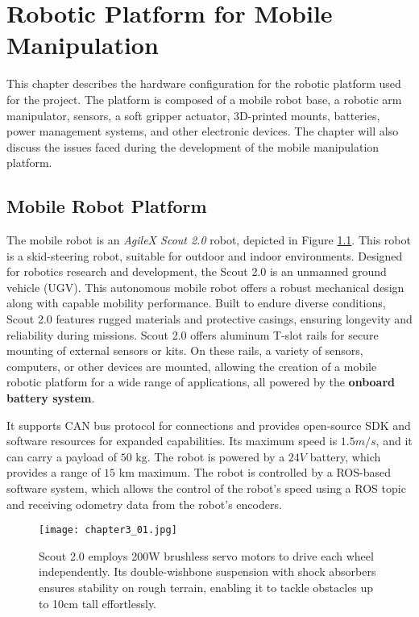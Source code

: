 
\chapter{Robotic Platform for Mobile Manipulation}

This chapter describes the hardware configuration for the robotic platform used for the project.
The platform is composed of a mobile robot base, a robotic arm manipulator, sensors, 
a soft gripper actuator, 3D-printed mounts, batteries, power management systems, and other electronic devices.
The chapter will also discuss the issues faced during the development of the mobile manipulation platform.

\section{Mobile Robot Platform}

The mobile robot is an \textit{AgileX Scout 2.0} robot, depicted in Figure \ref{fig:c3_img01}.
This robot is a skid-steering robot, suitable for outdoor and indoor environments. 
Designed for robotics research and development, the Scout 2.0 is an unmanned ground vehicle (UGV). 
This autonomous mobile robot offers a robust mechanical design along with capable mobility performance. 
Built to endure diverse conditions, Scout 2.0 features rugged materials and protective casings, ensuring longevity
and reliability during missions. Scout 2.0 offers aluminum T-slot rails for secure mounting of external sensors or kits. 
On these rails, a variety of sensors, computers, or other devices are mounted, allowing the creation of a mobile robotic platform
for a wide range of applications, all powered by the \textbf{onboard battery system}.

It supports CAN bus protocol for connections and provides open-source SDK and software resources for expanded capabilities.
Its maximum speed is $1.5 m/s$, and it can carry a payload of $50$ kg. 
The robot is powered by a $24V$ battery, which provides a range of $15$ km maximum. 
The robot is controlled by a ROS-based software system, which allows the control of the robot's speed using a ROS topic
and receiving odometry data from the robot's encoders.

\begin{figure}[t]
	\centering
	\texttt{[image: chapter3\_01.jpg]}
	\captionsetup{width=1\linewidth}
	\caption{Scout 2.0 employs 200W brushless servo motors to drive each wheel independently. 
    Its double-wishbone suspension with shock absorbers ensures stability on rough terrain, 
    enabling it to tackle obstacles up to 10cm tall effortlessly.}
	\label{fig:c3_img01}
\end{figure}

